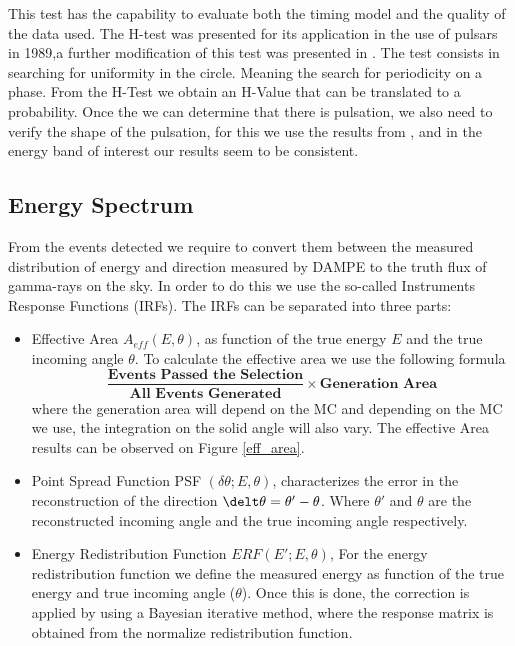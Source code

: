 \documentclass{PoS}
\begin{document}
This test has the capability to evaluate both the timing model and the quality of the data used.  The H-test was presented for its application in the use of pulsars in 1989,a further  modification of this test was presented in \cite{h-test}.
The test consists in searching for uniformity in the circle.  Meaning the search for  periodicity on  a phase. From the H-Test we obtain an H-Value that can be translated to a probability.
Once the we can determine that there is pulsation, we also need to verify the shape of the pulsation, for this we use the results from \cite{2catalogfermi}, and in the energy band of interest our results seem to be consistent.  






\subsection{Energy Spectrum}
From the  events detected we require to convert them between the measured distribution of energy and direction measured by DAMPE to the truth flux of gamma-rays on the sky. In order to do this we use the so-called Instruments Response Functions (IRFs). The IRFs  can be  separated into three parts: 
\begin{itemize}
    \item Effective Area $A_{eff}(E,\theta)$, as function of the true energy $E$ and the true incoming angle $\theta$.  To calculate the effective area we use the following formula
\begin{equation}
\frac{\textbf{Events Passed the Selection}}{\textbf{All Events Generated}}\times {\textbf{Generation Area}}
\end{equation} 
where the generation area will depend on the  MC and depending on the MC we use, the integration on the solid angle will also vary. The effective Area results can be observed on Figure \ref{eff_area}.
    \item Point Spread Function PSF $(\delta\theta;E,\theta)$, characterizes the error in the reconstruction of the direction $\delt \theta=\theta'-\theta $. Where $\theta'$ and $\theta$ are the reconstructed incoming angle and the true incoming angle respectively.
    \item Energy Redistribution Function $ERF (E';E,\theta)$, For the energy redistribution function we define the measured energy as function of the true energy and true incoming angle ($\theta$). Once this is done, the correction is applied by using a Bayesian iterative method, where the response matrix is obtained from the normalize redistribution function.
    
\end{itemize}
\end{document}
